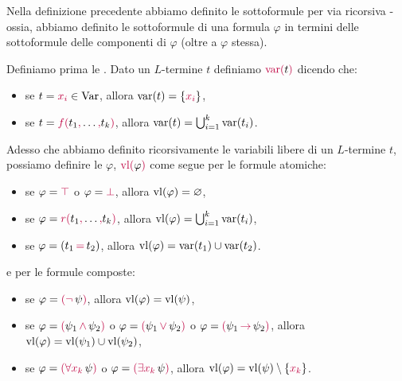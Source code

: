 Nella definizione precedente abbiamo definito le sottoformule per via ricorsiva - ossia, abbiamo definito le sottoformule di una formula $\varphi$ in termini delle sottoformule delle componenti di $\varphi$ (oltre a $\varphi$ stessa).

\begin{definition}
    Definiamo prima le . Dato un $L$-termine $t$ definiamo $\textcolor{purple}{\operatorname{var}(} t \textcolor{purple}{)}$ dicendo che:
    \begin{itemize}
        \item se $t = \textcolor{purple}{x_i} \in \operatorname{Var}$, allora $\operatorname{var}(t) = \{\textcolor{purple}{x_i}\}$,
        \item se $t = \textcolor{purple}{f(}t_1\textcolor{purple}{,} \ldots\textcolor{purple}{,} t_k\textcolor{purple}{)}$, allora $\operatorname{var}(t) = \bigcup_{i = 1}^k \operatorname{var}(t_i)$.
    \end{itemize}
    Adesso che abbiamo definito ricorsivamente le variabili libere di un $L$-termine $t$, possiamo definire le  $\varphi$, $\textcolor{purple}{\operatorname{vl}(} \varphi \textcolor{purple}{)}$ come segue per le formule atomiche:
    \begin{itemize}
        \item se $\varphi = \textcolor{purple}{\top}$ o $\varphi = \textcolor{purple}{\bot}$, allora $\operatorname{vl}(\varphi) = \varnothing$,
        \item se $\varphi = \textcolor{purple}{r(} t_1\textcolor{purple}{,} \ldots\textcolor{purple}{,} t_k\textcolor{purple}{)}$, allora $\operatorname{vl}(\varphi) = \bigcup_{i = 1}^k \operatorname{var}(t_i)$,
        \item se $\varphi = (t_1\, \textcolor{purple}{=}\, t_2)$, allora $\operatorname{vl}(\varphi) = \operatorname{var}(t_1) \cup \operatorname{var}(t_2)$.
    \end{itemize}
    e per le formule composte:
    \begin{itemize}
        \item se $\varphi = \textcolor{purple}{(\neg}\, \psi \textcolor{purple}{)}$, allora $\operatorname{vl}(\varphi) = \operatorname{vl}(\psi)$,
        \item se $\varphi = \textcolor{purple}{(} \psi_1 \,\textcolor{purple}{\land} \,\psi_2 \textcolor{purple}{)}$ o $\varphi = \textcolor{purple}{(} \psi_1\, \textcolor{purple}{\lor}\, \psi_2 \textcolor{purple}{)}$ o $\varphi = \textcolor{purple}{(} \psi_1\, \textcolor{purple}{\to} \,\psi_2 \textcolor{purple}{)}$, allora $\operatorname{vl}(\varphi) = \operatorname{vl}(\psi_1) \cup \operatorname{vl}(\psi_2)$,
        \item se $\varphi = \textcolor{purple}{(\forall x_k} \,\psi \textcolor{purple}{)}$ o $\varphi = \textcolor{purple}{(\exists x_k}\, \psi \textcolor{purple}{)}$, allora $\operatorname{vl}(\varphi) = \operatorname{vl}(\psi) \setminus \{\textcolor{purple}{x_k}\}$.
    \end{itemize}
\end{definition}

